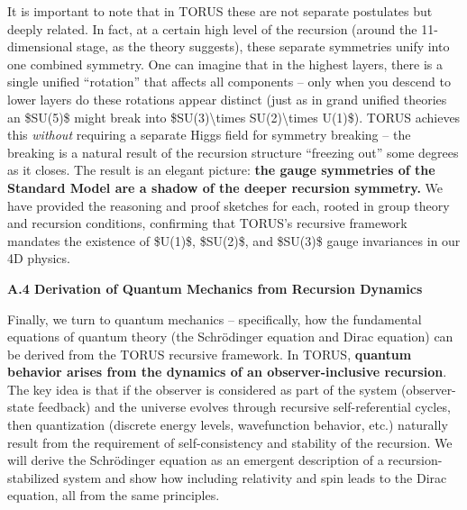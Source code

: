 It is important to note that in TORUS these are not separate postulates
but deeply related. In fact, at a certain high level of the recursion
(around the 11-dimensional stage, as the theory suggests), these
separate symmetries unify into one combined symmetry​. One can imagine
that in the highest layers, there is a single unified ``rotation'' that
affects all components -- only when you descend to lower layers do these
rotations appear distinct (just as in grand unified theories an
\$SU(5)\$ might break into \$SU(3)\textbackslash{}times
SU(2)\textbackslash{}times U(1)\$). TORUS achieves this \emph{without}
requiring a separate Higgs field for symmetry breaking -- the breaking
is a natural result of the recursion structure ``freezing out'' some
degrees as it closes​. The result is an elegant picture: \textbf{the
gauge symmetries of the Standard Model are a shadow of the deeper
recursion symmetry.} We have provided the reasoning and proof sketches
for each, rooted in group theory and recursion conditions, confirming
that TORUS's recursive framework mandates the existence of \$U(1)\$,
\$SU(2)\$, and \$SU(3)\$ gauge invariances in our 4D physics.

\textbf{A.4 Derivation of Quantum Mechanics from Recursion Dynamics}

Finally, we turn to quantum mechanics -- specifically, how the
fundamental equations of quantum theory (the Schrödinger equation and
Dirac equation) can be derived from the TORUS recursive framework. In
TORUS, \textbf{quantum behavior arises from the dynamics of an
observer-inclusive recursion}. The key idea is that if the observer is
considered as part of the system (observer-state feedback) and the
universe evolves through recursive self-referential cycles, then
quantization (discrete energy levels, wavefunction behavior, etc.)
naturally result from the requirement of self-consistency and stability
of the recursion. We will derive the Schrödinger equation as an emergent
description of a recursion-stabilized system and show how including
relativity and spin leads to the Dirac equation, all from the same
principles.

